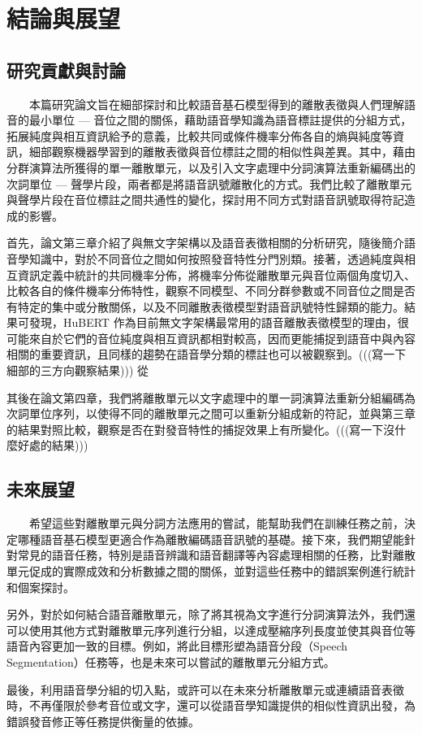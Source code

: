 \chapter{結論與展望} 

\section{研究貢獻與討論}

　　本篇研究論文旨在細部探討和比較語音基石模型得到的離散表徵與人們理解語音的最小單位 --- 音位之間的關係，藉助語音學知識為語音標註提供的分組方式，拓展純度與相互資訊給予的意義，比較共同或條件機率分佈各自的熵與純度等資訊，細部觀察機器學習到的離散表徵與音位標註之間的相似性與差異。其中，藉由分群演算法所獲得的單一離散單元，以及引入文字處理中分詞演算法重新編碼出的次詞單位 --- 聲學片段，兩者都是將語音訊號離散化的方式。我們比較了離散單元與聲學片段在音位標註之間共通性的變化，探討用不同方式對語音訊號取得符記造成的影響。

        首先，論文第三章介紹了與無文字架構以及語音表徵相關的分析研究，隨後簡介語音學知識中，對於不同音位之間如何按照發音特性分門別類。接著，透過純度與相互資訊定義中統計的共同機率分佈，將機率分佈從離散單元與音位兩個角度切入、比較各自的條件機率分佈特性，觀察不同模型、不同分群參數或不同音位之間是否有特定的集中或分散關係，以及不同離散表徵模型對語音訊號特性歸類的能力。結果可發現，HuBERT 作為目前無文字架構最常用的語音離散表徵模型的理由，很可能來自於它們的音位純度與相互資訊都相對較高，因而更能捕捉到語音中與內容相關的重要資訊，且同樣的趨勢在語音學分類的標註也可以被觀察到。(((寫一下細部的三方向觀察結果)))
從

        其後在論文第四章\textsl{}，我們將離散單元以文字處理中的單一詞演算法重新分組編碼為次詞單位序列，以使得不同的離散單元之間可以重新分組成新的符記，並與第三章的結果對照比較，觀察是否在對發音特性的捕捉效果上有所變化。(((寫一下沒什麼好處的結果)))

\section{未來展望}

　　希望這些對離散單元與分詞方法應用的嘗試，能幫助我們在訓練任務之前，決定哪種語音基石模型更適合作為離散編碼語音訊號的基礎。接下來，我們期望能針對常見的語音任務，特別是語音辨識和語音翻譯等內容處理相關的任務，比對離散單元促成的實際成效和分析數據之間的關係，並對這些任務中的錯誤案例進行統計和個案探討。

        另外，對於如何結合語音離散單元，除了將其視為文字進行分詞演算法外，我們還可以使用其他方式對離散單元序列進行分組，以達成壓縮序列長度並使其與音位等語音內容更加一致的目標。例如，將此目標形塑為語音分段（Speech Segmentation）任務等，也是未來可以嘗試的離散單元分組方式。

        最後，利用語音學分組的切入點，或許可以在未來分析離散單元或連續語音表徵時，不再僅限於參考音位或文字，還可以從語音學知識提供的相似性資訊出發，為錯誤發音修正等任務提供衡量的依據。
